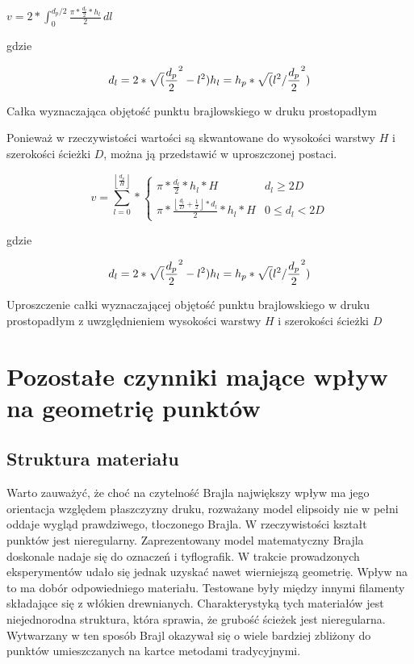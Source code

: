 \documentclass[12pt,a4paper]{article}
\begin{document}
\begin{feq}
$v = 2 * \int_{0}^{d_p/2} \frac{\pi * \frac{d_l}{2} * h_l}{2} \, dl$

gdzie

$$
d_l = 2 * \sqrt(\frac{d_p}{2}^2 - l^2) \\
h_l = h_p * \sqrt(l^2 / \frac{d_p}{2}^2)
$$
\caption{Całka wyznaczająca objętość punktu brajlowskiego w druku prostopadłym}
\end{feq}

Ponieważ w rzeczywistości wartości są skwantowane do wysokości warstwy $H$ i szerokości ścieżki $D$, można ją przedstawić w uproszczonej postaci.
\begin{feq}
$$
v = \sum_{l=0}^{\left\lfloor\frac{d_p}{H}\right\rfloor} *
\begin{cases}
\pi * \frac{d_l}{2} * h_l * H & d_l \geq 2D \\
\pi * \frac{\left \lfloor \frac{d_l}{D} + \frac{1}{2} \right \rfloor * d_l}{2} * h_l * H & 0 \leq d_l < 2D
\end{cases}
$$

gdzie

$$
d_l = 2 * \sqrt(\frac{d_p}{2}^2 - l^2) \\
h_l = h_p * \sqrt(l^2 / \frac{d_p}{2}^2)
$$
\caption{Uproszczenie całki wyznaczającej objętość punktu brajlowskiego w druku prostopadłym z uwzględnieniem wysokości warstwy $H$ i szerokości ścieżki $D$}
\end{feq}

\section{Pozostałe czynniki mające wpływ na geometrię punktów}
\label{sec:factors}
\subsection{Struktura materiału}
Warto zauważyć, że choć na czytelność Brajla największy wpływ ma jego orientacja względem płaszczyzny druku, rozważany model elipsoidy nie w pełni oddaje wygląd prawdziwego, tłoczonego Brajla. W rzeczywistości kształt punktów jest nieregularny.
Zaprezentowany model matematyczny Brajla doskonale nadaje się do oznaczeń i tyflografik. W trakcie prowadzonych eksperymentów udało się jednak uzyskać nawet wierniejszą geometrię.
Wpływ na to ma dobór odpowiedniego materiału. Testowane były między innymi filamenty składające się z włókien drewnianych. Charakterystyką tych materiałów jest niejednorodna struktura, która sprawia, że grubość ścieżek jest nieregularna. Wytwarzany w ten sposób Brajl okazywał się o wiele bardziej zbliżony do punktów umieszczanych na kartce metodami tradycyjnymi.
\end{document}
